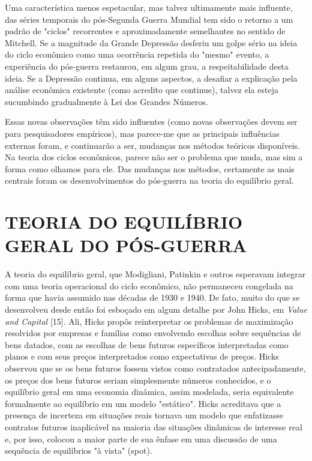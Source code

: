 \documentclass[12pt]{article}
\begin{document}
Uma característica menos espetacular, mas talvez ultimamente mais influente, das séries temporais do pós-Segunda Guerra Mundial tem sido o retorno a um padrão de "ciclos" recorrentes e aproximadamente semelhantes no sentido de Mitchell. Se a magnitude da Grande Depressão desferiu um golpe sério na ideia do ciclo econômico como uma ocorrência repetida do "mesmo" evento, a experiência do pós-guerra restaurou, em algum grau, a respeitabilidade desta ideia. Se a Depressão continua, em alguns aspectos, a desafiar a explicação pela análise econômica existente (como acredito que continue), talvez ela esteja sucumbindo gradualmente à Lei dos Grandes Números.

Essas novas observações têm sido influentes (como novas observações devem ser para pesquisadores empíricos), mas parece-me que as principais influências externas foram, e continuarão a ser, mudanças nos métodos teóricos disponíveis. Na teoria dos ciclos econômicos, parece não ser o problema que muda, mas sim a forma como olhamos para ele. Das mudanças nos métodos, certamente as mais centrais foram os desenvolvimentos do pós-guerra na teoria do equilíbrio geral.

\section{TEORIA DO EQUILÍBRIO GERAL DO PÓS-GUERRA}

A teoria do equilíbrio geral, que Modigliani, Patinkin e outros esperavam integrar com uma teoria operacional do ciclo econômico, não permaneceu congelada na forma que havia assumido nas décadas de 1930 e 1940. De fato, muito do que se desenvolveu desde então foi esboçado em algum detalhe por John Hicks, em \textit{Value and Capital} [15]. Ali, Hicks propôs reinterpretar os problemas de maximização resolvidos por empresas e famílias como envolvendo escolhas sobre sequências de bens datados, com as escolhas de bens futuros específicos interpretadas como planos e com seus preços interpretados como expectativas de preços. Hicks observou que se os bens futuros fossem vistos como contratados antecipadamente, os preços dos bens futuros seriam simplesmente números conhecidos, e o equilíbrio geral em uma economia dinâmica, assim modelada, seria equivalente formalmente ao equilíbrio em um modelo "estático". Hicks acreditava que a presença de incerteza em situações reais tornava um modelo que enfatizasse contratos futuros inaplicável na maioria das situações dinâmicas de interesse real e, por isso, colocou a maior parte de sua ênfase em uma discussão de uma sequência de equilíbrios "à vista" (spot).
\end{document}
